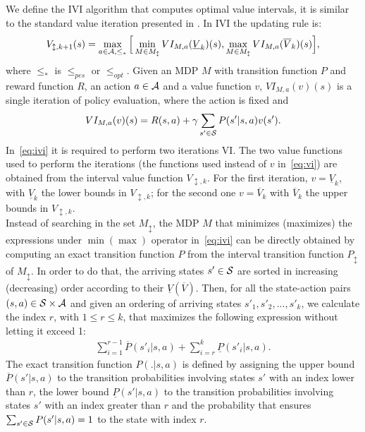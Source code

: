 \newline
We define the \acf{IVI} algorithm that computes optimal value intervals, it is similar to the standard value iteration presented in . In \ac{IVI} the updating rule is:
\begin{align}
V_{\updownarrow, k+1}(s) = \max_{a \in \mathcal{A}, \leq_{*}} \Big[ \min_{M \in M_{\updownarrow}} VI_{M, a}(\underline{V}_{k})(s), \max_{M \in M_{\updownarrow}} VI_{M, a}(\overline{V}_{k})(s) \Big], \label{eq:ivi}
\end{align}
where $\leq_{*}$ is $\leq_{pes}$ or $\leq_{opt}$. Given an \ac{MDP} $M$ with transition function $P$ and reward function $R$, an action $a \in \mathcal{A}$ and a value function $v$, $VI_{M, a}(v)(s)$ is a single iteration of policy evaluation, where the action is fixed and 
\begin{align} 
VI_{M, a}(v)(s) = R(s,a) + \gamma \sum_{s' \in \mathcal{S}} P(s'|s,a)v(s'). \label{eq:vi}
\end{align}
In~\eqref{eq:ivi} it is required to perform two iterations VI. The two value functions used to perform the iterations (\ie the functions used instead of $v$ in~\eqref{eq:vi}) are obtained from the interval value function $V_{\updownarrow, k}$. For the first iteration, $v = \underline{V}_{k}$, with $\underline{V}_{k}$ the lower bounds in $V_{\updownarrow, k}$; for the second one $v = \overline{V}_{k}$ with $\overline{V}_{k}$ the upper bounds in $V_{\updownarrow, k}$.\\
\newline
Instead of searching in the set $M_{\updownarrow}$, the \ac{MDP} $M$ that minimizes (maximizes) the expressions under $\min (\max)$ operator in~\eqref{eq:ivi} can be directly obtained by computing an exact transition function $P$ from the interval transition function $P_{\updownarrow}$ of $M_{\updownarrow}$. In order to do that, the arriving states $s' \in \mathcal{S}$ are sorted in increasing (decreasing) order according to their $\underline{V}(\overline{V})$. Then, for all the state-action pairs $(s,a) \in \mathcal{S} \times \mathcal{A}$ and given an ordering of arriving states $s'_1, s'_2, ..., s'_k$, we calculate the index $r$, with $1 \leq r \leq k$, that maximizes the following expression without letting it exceed 1:
\begin{align} \sum_{i=1}^{r-1}\overline{P}(s'_i|s,a) + \sum_{i=r}^{k}\underline{P}(s'_i|s,a). \end{align}
The exact transition function $P(.|s,a)$ is defined by assigning the upper bound $\overline{P}(s'|s,a)$ to the transition probabilities involving states $s'$ with an index lower than $r$, the lower bound $\underline{P}(s'|s,a)$ to the transition probabilities involving states $s'$ with an index greater than $r$ and the probability that ensures $\sum_{s' \in \mathcal{S}}P(s'|s,a) = 1$ to the state with index $r$.

